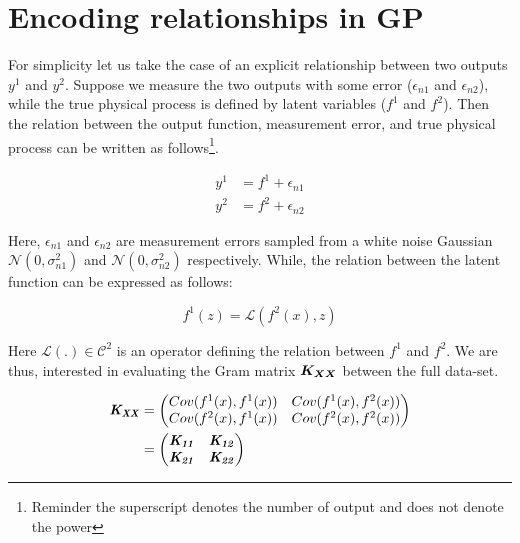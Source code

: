 \section{Encoding relationships in GP}\label{secEncodingRelationships}
For simplicity let us take the case of an explicit relationship between two outputs \(y^{1}\) and \(y^{2}\). Suppose we measure the two outputs with some error ($\epsilon_{n1}$ and $\epsilon_{n2}$), while the true physical process is defined by latent variables (\(f^{1}\) and \(f^{2}\)). Then the relation between the output function, measurement error, and true physical process can be written as follows\footnote{Reminder the superscript denotes the number of output and does not denote the power}. 

\begin{align} \label{eq:relationOutputLatentCh7}
y^{1} & = f^{1} + \epsilon_{n1} \\
y^{2} & = f^{2} + \epsilon_{n2}
\end{align} 

Here, \(\epsilon_{n1}\) and \(\epsilon_{n2}\) are measurement errors sampled from a white noise Gaussian \(\mathcal{N}(0, \sigma_{n1}^2)\) and \(\mathcal{N}(0, \sigma_{n2}^2)\) respectively. While, the relation between the latent function can be expressed as follows:

\begin{equation}\label{eq:physicalRelation}
    f^{1}(z) = \mathcal{L}\left ( f^{2}(x), z \right )
\end{equation}

Here \(\mathcal{L} \left ( . \right ) \in \mathcal{C}^{2}\) is an operator defining the relation between \(f^{1}\) and \(f^{2}\). We are thus, interested in evaluating the Gram matrix $\boldsymbol{K_{XX}}$ between the full data-set. 

\begin{align}\label{eq:exactJointCovariance}
      \bm{\mathit{K_{XX}}} & =  \begin{pmatrix}
    Cov(f^1(x), f^1(x))  & Cov(f^1(x), f^2(x))\\ 
    Cov(f^2(x), f^1(x))     & Cov(f^2(x), f^2(x))
   \end{pmatrix} \\
   & = \begin{pmatrix}
    \bm{\mathit{K_{11}}}  & \bm{\mathit{K_{12}}}\\ 
    \bm{\mathit{K_{21}}}    & \bm{\mathit{K_{22}}}
   \end{pmatrix}
\end{align}

